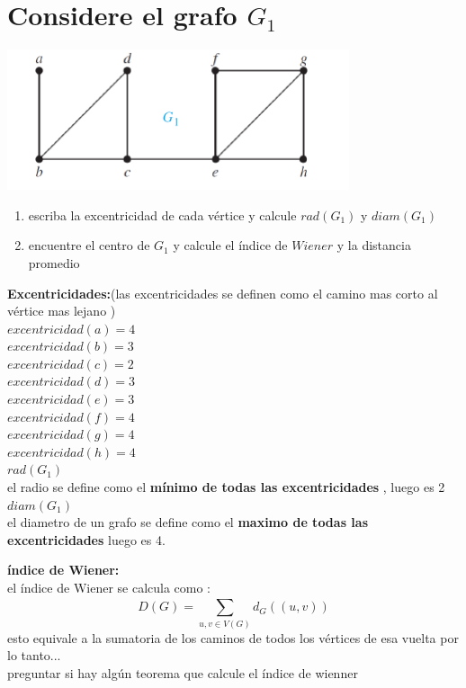 \documentclass[10pt,a4paper]{article} %
\begin{document}
    \section{Considere el grafo $G_1$ }
        \begin{center}
        \includegraphics[width=0.4\linewidth]{grafop2.png}
        \end{center}
        \begin{center}
        \begin{enumerate}
            \item {escriba la excentricidad de cada vértice y calcule $rad(G_1)$ y $diam(G_1)$}
            \item {encuentre el centro de $G_1$ y calcule el índice de $Wiener$
                y la distancia promedio}
        \end{enumerate}
        \end{center}
        \textbf{Excentricidades:}(las excentricidades se definen como el camino
        mas corto al vértice mas lejano )
        \\
        $excentricidad(a) = 4$
        \\
        $excentricidad(b) = 3$
        \\
        $excentricidad(c) = 2$
        \\
        $excentricidad(d) = 3$
        \\
        $excentricidad(e) = 3$
        \\
        $excentricidad(f) = 4$
        \\
        $excentricidad(g) =  4$
        \\
        $excentricidad(h) = 4$
        \\
        \textbf{$rad(G_1)$}
        \\
        el radio se define como el \textbf{mínimo de todas las excentricidades}
        , luego es 2
        \\
        \textbf{$diam(G_1)$}
        \\
        el diametro de un grafo se define como el \textbf{maximo de todas las
        excentricidades}  luego es 4.

        \textbf{índice de Wiener:}
        \\
        el índice de Wiener se calcula como :
        \begin{equation}
            D(G) = \sum_{u,v \in V(G)}^{} d_G((u,v))
        \end{equation}
        esto equivale a la sumatoria de los caminos de todos los vértices de
        esa vuelta por lo tanto...
        \\
        \color{red} preguntar si hay algún teorema que calcule el índice de
        wienner \color{black}
\end{document}
